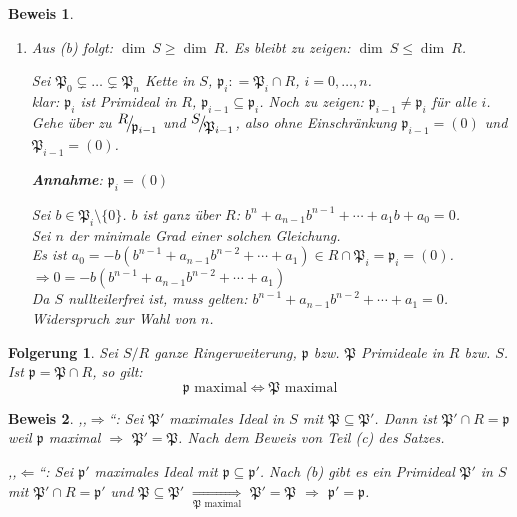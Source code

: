 \documentclass[a4paper,12pt]{scrbook}
\theoremstyle{break}
\newtheorem{Folg}[Def]{Folgerung}
\theoremstyle{nonumberbreak}
\newtheorem{Bew}{Beweis}
\theoremstyle{nonumberplain}
\newcommand{\defeqr}[0]{\mathrel{\mathop:}=}
\newcommand{\FakRaum}[2]{
  \raisebox{0.7ex}{\ensuremath{#1}}
  \ensuremath{\mkern-3mu}\big/\ensuremath{\mkern-3mu}
  \raisebox{-0.6ex}{\ensuremath{#2}}}
\begin{document}
\begin{Bew}
\begin{enumerate}
\item Aus (b) folgt: $\dim\ S\geq\dim\ R$. Es bleibt zu
zeigen: $\dim\ S \leq \dim\ R$.

Sei $\mathfrak{P}_0\subsetneq \ldots \subsetneq \mathfrak{P}_n$ Kette in $S$, 
$\mathfrak{p}_i\defeqr \mathfrak{P}_i\cap R$, $i=0,\ldots,n$.\\
klar: $\mathfrak{p}_i$ ist Primideal in $R$, $\mathfrak{p}_{i-1}\subseteq \mathfrak{p}_i$.
Noch zu zeigen: $\mathfrak{p}_{i-1}\neq \mathfrak{p}_i$ für alle $i$.\\
Gehe über zu $\FakRaum{R}{\mathfrak{p}_{i-1}}$ und $\FakRaum{S}{\mathfrak{P}_{i-1}}$, also ohne Einschränkung $\mathfrak{p}_{i-1}=(0)$ und $\mathfrak{P}_{i-1}=(0)$.

\textbf{Annahme}: $\mathfrak{p}_i=(0)$

Sei $b\in \mathfrak{P}_{i} \setminus \{0\}$. $b$ ist ganz über $R$: $b^n+a_{n-1}b^{n-1}+\cdots+a_1b+a_0=0$.\\
Sei $n$ der minimale Grad einer solchen Gleichung.\\
Es ist $a_0=-b(b^{n-1}+a_{n-1}b^{n-2}+\cdots+a_1)\in R\cap \mathfrak{P}_i=\mathfrak{p}_i=(0)$.\\
$\Rightarrow 0=-b(b^{n-1}+a_{n-1}b^{n-2}+\cdots+a_1)$\\
Da $S$ nullteilerfrei ist, muss gelten: $b^{n-1}+a_{n-1}b^{n-2}+\cdots+a_1=0$.\\
Widerspruch zur Wahl von $n$.

\end{enumerate}
\end{Bew}

\begin{Folg}
\label{2.26}
Sei $S/R$ ganze Ringerweiterung, $\mathfrak{p}$ bzw. $\mathfrak{P}$ Primideale in $R$ bzw. $S$.
Ist $\mathfrak{p}=\mathfrak{P}\cap R$, so gilt:
$$\mathfrak{p} \text{ maximal} \Longleftrightarrow \mathfrak{P} \text{ maximal}$$
\end{Folg}

\begin{Bew}
,,$\Rightarrow$``: Sei $\mathfrak{P}'$ maximales Ideal in $S$ mit 
$\mathfrak{P}\subseteq \mathfrak P'$. Dann ist $\mathfrak{P}'\cap R=\mathfrak{p}$ weil
$\mathfrak{p}$ maximal $\Rightarrow$ $\mathfrak{P'}=\mathfrak{P}$. Nach dem Beweis
von Teil (c) des Satzes.

,,$\Leftarrow$``: Sei $\mathfrak{p}'$ maximales Ideal mit $\mathfrak{p}\subseteq \mathfrak{p'}$.
Nach (b) gibt es ein Primideal $\mathfrak{P}'$ in $S$ mit $\mathfrak{P}'\cap R=\mathfrak{p}'$
und $\mathfrak{P}\subseteq \mathfrak{P}'$ $\underset{\mathfrak{P}\text{ maximal}}{\Longrightarrow}$ $\mathfrak{P'}=\mathfrak{P}$ $\Rightarrow$ $\mathfrak{p}'=\mathfrak{p}$.

\end{Bew}
\end{document}
